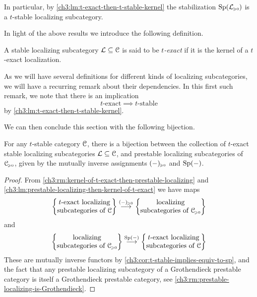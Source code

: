 \begin{remark}
    In particular, by \cref{ch3:lm:t-exact-then-t-stable-kernel} the stabilization $\mathrm{Sp}(\mathcal{L}_{\hspace{-1pt}\scriptscriptstyle\geqslant 0})$ is a $t$-stable localizing subcategory. 
\end{remark}

In light of the above results we introduce the following definition. 

\begin{definition}
    A stable localizing subcategory $\mathcal{L}\subseteq \EuScript{C}$ is said to be \emph{$t$-exact} if it is the kernel of a $t$-exact localization. 
\end{definition}

\begin{remark}
    \label{ch3:rm:recurring-1}
    As we will have several definitions for different kinds of localizing subcategories, we will have a recurring remark about their dependencies. In this first such remark, we note that there is an implication
    \[t\text{-exact}\implies t\text{-stable}\]
    by \cref{ch3:lm:t-exact-then-t-stable-kernel}. 
\end{remark}

We can then conclude this section with the following bijection. 

\begin{corollary}
    \label{ch3:cor:t-exact-corresponds-to-prestable-localizing}
    For any $t$-stable category $\EuScript{C}$, there is a bijection between the collection of $t$-exact stable localizing subcategories $\mathcal{L}\subseteq \EuScript{C}$, and prestable localizing subcategories of $\EuScript{C}_{\hspace{-1pt}\scriptscriptstyle\geqslant 0}$, given by the mutually inverse assignments $(-)_{\hspace{-1pt}\scriptscriptstyle\geqslant 0}$ and $\mathrm{Sp}(-)$. 
\end{corollary}
\begin{proof}
    From \cref{ch3:rm:kernel-of-t-exact-then-prestable-localizing} and \cref{ch3:lm:prestable-localizing-then-kernel-of-t-exact} we have maps 
    \[\left\{ \begin{matrix} t\text{-exact localizing}\\ \text{subcategories of }\EuScript{C} \end{matrix} \right\}\overset{(-)_{\hspace{-1pt}\scriptscriptstyle\geqslant 0}}{\longrightarrow} \left\{ \begin{matrix} \text{localizing}\\ \text{subcategories of }\EuScript{C}_{\hspace{-1pt}\scriptscriptstyle\geqslant 0} \end{matrix} \right\}\] 
    and 
    \[\left\{ \begin{matrix} \text{localizing}\\ \text{subcategories of }\EuScript{C}_{\hspace{-1pt}\scriptscriptstyle\geqslant 0} \end{matrix} \right\}\overset{\mathrm{Sp}(-)}{\longrightarrow} \left\{ \begin{matrix} t\text{-exact localizing}\\ \text{subcategories of }\EuScript{C} \end{matrix} \right\}\] 
    These are mutually inverse functors by \cref{ch3:cor:t-stable-implies-equiv-to-sp}, and the fact that any prestable localizing subcategory of a Grothendieck prestable category is itself a Grothendieck prestable category, see \cref{ch3:rm:prestable-localizing-is-Grothendieck}. 
\end{proof}




